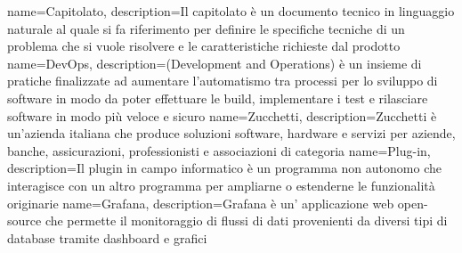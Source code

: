 {
    name=Capitolato,
    description={Il capitolato è un documento tecnico in linguaggio naturale al quale si fa riferimento per definire le specifiche tecniche di un problema che si vuole risolvere e le caratteristiche richieste dal prodotto}
}
{
    name=DevOps,
    description={(Development and Operations) è un insieme di pratiche finalizzate ad aumentare l'automatismo tra processi per lo sviluppo di software in modo da poter effettuare le build, implementare i test e rilasciare software in modo più veloce e sicuro}
}
{
    name=Zucchetti,
    description={Zucchetti è un'azienda italiana che produce soluzioni software, hardware e servizi per aziende, banche, assicurazioni, professionisti e associazioni di categoria}
}
{
    name=Plug-in,
    description={Il plugin in campo informatico è un programma non autonomo che interagisce con un altro programma per ampliarne o estenderne le funzionalità originarie}
}
{
    name=Grafana,
    description={Grafana è un' applicazione web open-source che permette il monitoraggio di flussi di dati provenienti da diversi tipi di database tramite dashboard e grafici}
}

